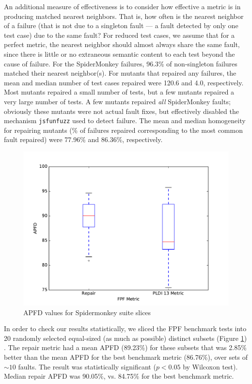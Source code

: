 An additional measure of effectiveness is to consider how effective a metric is in producing matched nearest neighbors.  That is, how often is the nearest neighbor of a failure (that is not due to a singleton fault --- a fault detected by only one test case) due to the same fault?  For reduced \cite{DD,PLDI13,
CReduce} test cases, we assume that for a perfect metric, the nearest neighbor should almost always share the same fault, since there is little or no extraneous semantic content to each test beyond the cause of failure.  For the SpiderMonkey failures, 96.3\% of non-singleton failures matched their nearest neighbor(s).  For mutants that repaired any failures, the mean and median number of test cases repaired were 120.6 and 4.0, respectively.  Most mutants repaired a small number of tests, but a few mutants repaired a very large number of tests.  A few mutants repaired \emph{all} SpiderMonkey faults; obviously these mutants were not actual fault fixes, but effectively disabled the mechanism {\tt jsfunfuzz} used to detect failure. The mean and median homogeneity for repairing mutants (\% of failures repaired corresponding to the most common fault repaired) were 77.96\% and 86.36\%, respectively.  

\begin{figure}
  \centering
  \includegraphics[width=0.8\columnwidth]{comparejs}
  \caption{APFD values for Spidermonkey suite slices}
  \label{comparejs}
\end{figure}%


In order to check our results statistically, we sliced the FPF benchmark tests into 20 randomly selected equal-sized (as much as possible) distinct subsets (Figure \ref{comparejs}) .  The repair metric had a mean APFD (89.23\%) for these subsets that was 2.85\% better than the mean APFD for the best benchmark metric (86.76\%), over sets of $\sim 10$ faults. The result was statistically significant ($p < 0.05$ by Wilcoxon test).   Median repair APFD was 90.05\%, vs. 84.75\% for the best benchmark metric.


